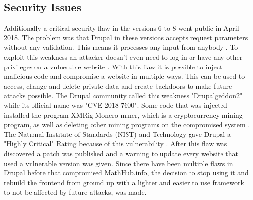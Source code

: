 \documentclass[11pt,a4paper]{article}
\begin{document}
\subsection{Security Issues} \label{security}
Additionally a critical security flaw in the versions 6 to 8 went public in April 2018.
The problem was that Drupal in these versions accepts request parameters without any validation.
This means it processes any input from anybody \cite{zdnet}.
To exploit this weakness an attacker doesn't even need to log in or have any other privileges on a vulnerable website \cite{register}.
With this flaw it is possible to inject malicious code and compromise a website in multiple ways.
This can be used to access, change and delete private data and create backdoors to make future attacks possible.
The Drupal community called this weakness "Drupalgeddon2" while its official name was "CVE-2018-7600".
Some code that was injected installed the program XMRig Monero miner, which is a cryptocurrency mining program, as well as deleting other mining programs on the compromised system \cite{hacker}.
The National Institute of Standards (NIST) and Technology gave Drupal a "Highly Critical" Rating because of this vulnerability \cite{nist}.
After this flaw was discovered a patch was published and a warning to update every website that used a vulnerable version was given.
\newline \newline	
Since there have been multiple flaws in Drupal before that compromised MathHub.info, the decision to stop using it and rebuild the frontend from ground up with a lighter and easier to use framework to not be affected by future attacks, was made.
\end{document}
